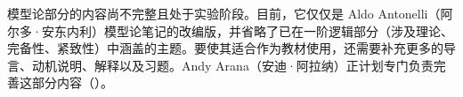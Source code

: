 \documentclass[../../include/open-logic-part]{subfiles}
\begin{document}

\begin{editorial}
  模型论部分的内容尚不完整且处于实验阶段。目前，它仅仅是 Aldo Antonelli（阿尔多·安东内利）模型论笔记的改编版，并省略了已在一阶逻辑部分（涉及理论、完备性、紧致性）中涵盖的主题。要使其适合作为教材使用，还需要补充更多的导言、动机说明、解释以及习题。Andy Arana（安迪·阿拉纳）正计划专门负责完善这部分内容（）。
\end{editorial}





\OLEndPartHook
\end{document}
